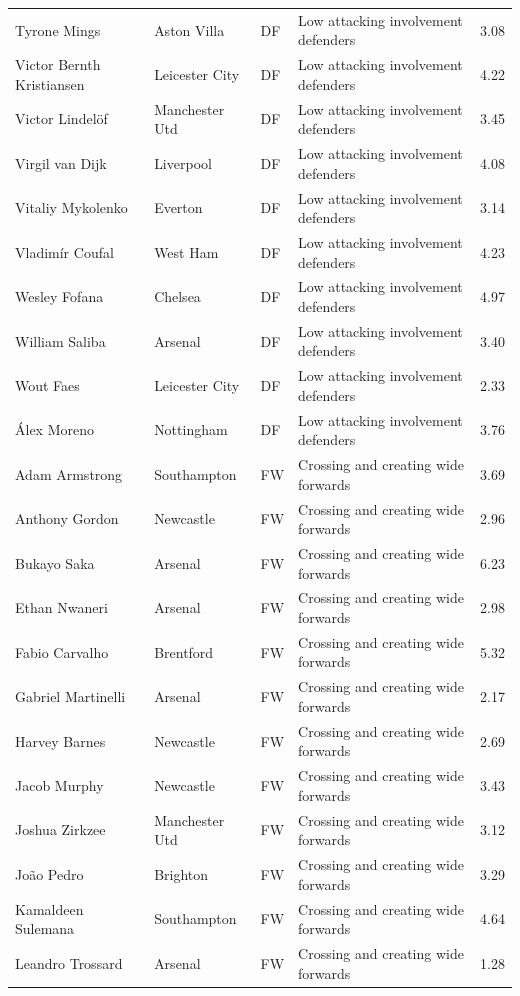 \begin{longtable}{p{3.4cm}p{2.5cm}p{1.0cm}p{5.0cm}r}
Tyrone Mings & Aston Villa & DF & Low attacking involvement defenders & 3.08 \\
Victor Bernth Kristiansen & Leicester City & DF & Low attacking involvement defenders & 4.22 \\
Victor Lindelöf & Manchester Utd & DF & Low attacking involvement defenders & 3.45 \\
Virgil van Dijk & Liverpool & DF & Low attacking involvement defenders & 4.08 \\
Vitaliy Mykolenko & Everton & DF & Low attacking involvement defenders & 3.14 \\
Vladimír Coufal & West Ham & DF & Low attacking involvement defenders & 4.23 \\
Wesley Fofana & Chelsea & DF & Low attacking involvement defenders & 4.97 \\
William Saliba & Arsenal & DF & Low attacking involvement defenders & 3.40 \\
Wout Faes & Leicester City & DF & Low attacking involvement defenders & 2.33 \\
Álex Moreno & Nottingham & DF & Low attacking involvement defenders & 3.76 \\
Adam Armstrong & Southampton & FW & Crossing and creating wide forwards & 3.69 \\
Anthony Gordon & Newcastle & FW & Crossing and creating wide forwards & 2.96 \\
Bukayo Saka & Arsenal & FW & Crossing and creating wide forwards & 6.23 \\
Ethan Nwaneri & Arsenal & FW & Crossing and creating wide forwards & 2.98 \\
Fabio Carvalho & Brentford & FW & Crossing and creating wide forwards & 5.32 \\
Gabriel Martinelli & Arsenal & FW & Crossing and creating wide forwards & 2.17 \\
Harvey Barnes & Newcastle & FW & Crossing and creating wide forwards & 2.69 \\
Jacob Murphy & Newcastle & FW & Crossing and creating wide forwards & 3.43 \\
Joshua Zirkzee & Manchester Utd & FW & Crossing and creating wide forwards & 3.12 \\
João Pedro & Brighton & FW & Crossing and creating wide forwards & 3.29 \\
Kamaldeen Sulemana & Southampton & FW & Crossing and creating wide forwards & 4.64 \\
Leandro Trossard & Arsenal & FW & Crossing and creating wide forwards & 1.28 \\

\end{longtable}

